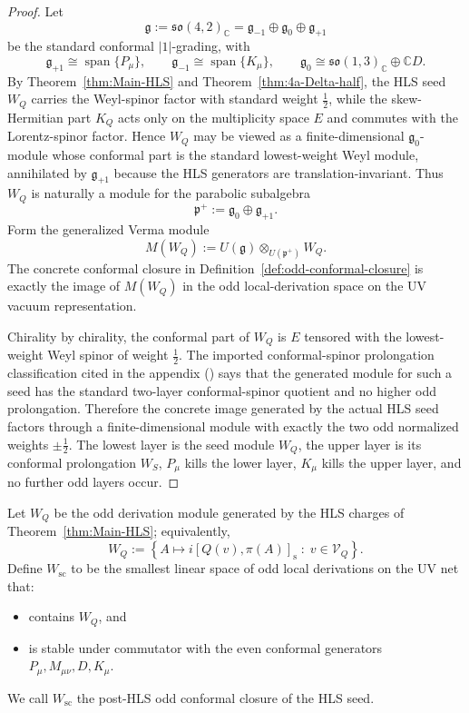 \begin{proof}
Let
\[
  \mathfrak g:=\mathfrak{so}(4,2)_\mathbb C
  =
  \mathfrak g_{-1}\oplus\mathfrak g_0\oplus\mathfrak g_{+1}
\]
be the standard conformal \(|1|\)-grading, with
\[
  \mathfrak g_{+1}\cong\operatorname{span}\{P_\mu\},
  \qquad
  \mathfrak g_{-1}\cong\operatorname{span}\{K_\mu\},
  \qquad
  \mathfrak g_0\cong\mathfrak{so}(1,3)_\mathbb C\oplus\mathbb C D.
\]
By Theorem~\ref{thm:Main-HLS} and Theorem~\ref{thm:4a-Delta-half}, the HLS seed
\(W_Q\) carries the Weyl-spinor factor with standard weight \(\tfrac12\), while the
skew-Hermitian part \(K_Q\) acts only on the multiplicity space \(E\) and commutes
with the Lorentz-spinor factor. Hence \(W_Q\) may be viewed as a
finite-dimensional \(\mathfrak g_0\)-module whose conformal part is the standard
lowest-weight Weyl module, annihilated by \(\mathfrak g_{+1}\) because the HLS
generators are translation-invariant. Thus \(W_Q\) is naturally a module for the
parabolic subalgebra
\[
  \mathfrak p^+:=\mathfrak g_0\oplus\mathfrak g_{+1}.
\]
Form the generalized Verma module
\[
  M(W_Q):=U(\mathfrak g)\otimes_{U(\mathfrak p^+)}W_Q.
\]
The concrete conformal closure in Definition~\ref{def:odd-conformal-closure} is
exactly the image of \(M(W_Q)\) in the odd local-derivation space on the UV
vacuum representation.

Chirality by chirality, the conformal part of \(W_Q\) is \(E\) tensored with the
lowest-weight Weyl spinor of weight \(\tfrac12\). The imported conformal-spinor
prolongation classification cited in the appendix (\cite{Kac1977,Nahm:1977tg})
says that the generated module for such a seed has the standard two-layer
conformal-spinor quotient and no higher odd prolongation. Therefore the concrete
image generated by the actual HLS seed factors through a finite-dimensional module
with exactly the two odd normalized weights \(\pm\tfrac12\). The lowest layer is
the seed module \(W_Q\), the upper layer is its conformal prolongation \(W_S\),
\(P_\mu\) kills the lower layer, \(K_\mu\) kills the upper layer, and no further
odd layers occur.
\end{proof}

\begin{definition}
\label{def:odd-conformal-closure}
Let \(W_Q\) be the odd derivation module generated by the HLS charges of
Theorem~\ref{thm:Main-HLS}; equivalently,
\[
W_Q
:=
\left\{
A\mapsto i[Q(v),\pi(A)]_{\mathrm s}
\;:\;
v\in\mathcal V_Q
\right\}.
\]
Define \(W_{\mathrm{sc}}\) to be the smallest linear space of odd local
derivations on the UV net that:
\begin{itemize}
  \item contains \(W_Q\), and
  \item is stable under commutator with the even conformal generators
        \(P_\mu,M_{\mu\nu},D,K_\mu\).
\end{itemize}
We call \(W_{\mathrm{sc}}\) the post-HLS odd conformal closure of the HLS seed.
\end{definition}

